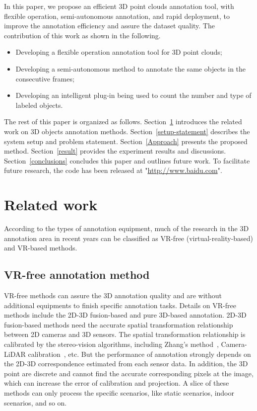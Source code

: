 \documentclass[letterpaper, 10 pt, conference]{ieeeconf}  %
\begin{document}
In this paper, we propose an efficient 3D point clouds annotation tool, with flexible operation, semi-autonomous annotation, and rapid deployment, to improve the annotation efficiency and assure the dataset quality. The contribution of this work as shown in the following.
\begin{itemize}
  \item Developing a flexible operation annotation tool for 3D point clouds;
  \item Developing a semi-autonomous method to annotate the same objects in the consecutive frames;
  \item Developing an intelligent plug-in being used to count the number and type of labeled objects.
\end{itemize}

The rest of this paper is organized as follows. Section~\ref{Realtedwork} introduces the related work on 3D objects annotation methods.
Section~\ref{setup-statement} describes the system setup and problem statement. Section~\ref{Approach} presents the proposed method.
Section~\ref{result} provides the experiment results and discussions. Section~\ref{conclusions} concludes this paper and outlines future work. To facilitate future research, the code has been released at "\url{http://www.baidu.com}".
\section{Related work}
\label{Realtedwork}
According to the types of annotation equipment, much of the research in the 3D annotation area in recent years can be classified as VR-free (virtual-reality-based) and VR-based methods.
\subsection{VR-free annotation method}
VR-free methods can assure the 3D annotation quality  and are without additional equipments to finish specific annotation tasks.
Details on VR-free methods include the 2D-3D fusion-based and pure 3D-based annotation.
2D-3D fusion-based methods need the accurate spatial transformation relationship between 2D cameras and 3D sensors.
The spatial transformation relationship is calibrated by the stereo-vision algorithms, including Zhang's method~\cite{zhangzhegnyou}, Camera-LiDAR calibration~\cite{roadCalibration}, etc.
But the performance of annotation strongly depends on the 2D-3D correspondence estimated from each sensor data. In addition, the 3D point are discrete and cannot find the accurate corresponding pixels at the image, which can increase the error of calibration and projection. A slice of these methods can only process the specific scenarios, like static scenarios, indoor scenarios, and so on.
\end{document}
